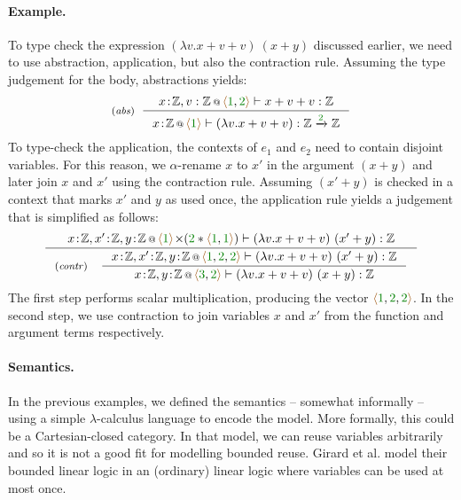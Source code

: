 \paragraph{Example.} To type check the expression $(\lambda v.x+v+v)~(x+y)$ discussed earlier, we need
to use abstraction, application, but also the contraction rule. Assuming the type judgement for the body,
abstractions yields:
%
\begin{equation*}
\tyrule{abs}
 { \coctx{x\!:\!\mathbb{Z},v:\mathbb{Z}}{\alift{\cclrd{1},\cclrd{2}}} \vdash x+v+v : \mathbb{Z} }
 { \coctx{x\!:\!\mathbb{Z}}{\alift{\cclrd{1}}} \vdash (\lambda v.x+v+v) : \mathbb{Z} \xrightarrow{\cclrd{2}} \mathbb{Z} }
\end{equation*}
%
To type-check the application, the contexts of $e_1$ and $e_2$ need to contain disjoint variables.
For this reason, we $\alpha$-rename $x$ to $x'$ in the argument $(x+y)$ and later join $x$ and $x'$ using
the contraction rule. Assuming $(x'+y)$ is checked in a context that marks $x'$ and $y$ as used once, the 
application rule yields a judgement that is simplified as follows:
%
\begin{equation*}
\inference
  { \coctx{x\!:\!\mathbb{Z},x'\!:\!\mathbb{Z},y\!:\!\mathbb{Z}}
          {\alift{\cclrd{1}} \cons (\cclrd{2} \ast \alift{\cclrd{1},\cclrd{1}}) } \vdash (\lambda v.x+v+v)~(x'+y) : \mathbb{Z} }
{\tyrule{contr}
  { \coctx{x\!:\!\mathbb{Z},x'\!:\!\mathbb{Z},y\!:\!\mathbb{Z}}{\alift{\cclrd{1}, \cclrd{2}, \cclrd{2}} } \vdash (\lambda v.x+v+v)~(x'+y) : \mathbb{Z} }
  { \coctx{x\!:\!\mathbb{Z},y\!:\!\mathbb{Z}}{\alift{\cclrd{3}, \cclrd{2}}} \vdash (\lambda v.x+v+v)~(x+y)  : \mathbb{Z}} }
\end{equation*}
%
The first step performs scalar multiplication, producing the vector
$\alift{\cclrd{1},\cclrd{2},\cclrd{2}}$. In the second step, we use contraction to join variables 
$x$ and $x'$ from the function and argument terms respectively.


\paragraph{Semantics.}
In the previous examples, we defined the semantics -- somewhat informally -- using a simple 
$\lambda$-calculus language to encode the model. More formally, this could be a Cartesian-closed 
category. In that model, we can reuse variables arbitrarily and so it is not
a good fit for modelling bounded reuse. Girard et al. \cite{logic-bounded} model their bounded
linear logic in an (ordinary) linear logic where variables can be used at most once.

